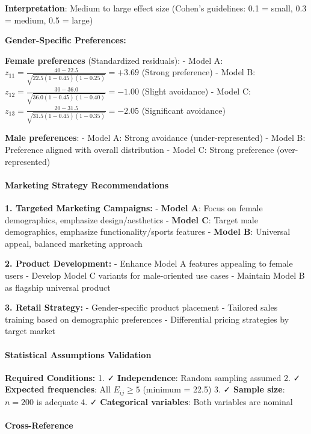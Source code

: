 \documentclass[11pt]{article}
\begin{document}
\textbf{Interpretation}: Medium to large effect size (Cohen's
guidelines: 0.1 = small, 0.3 = medium, 0.5 = large)

\textbf{Gender-Specific Preferences:}

\textbf{Female preferences} (Standardized residuals): - Model A:
\(z_{11} = \frac{40 - 22.5}{\sqrt{22.5(1-0.45)(1-0.25)}} = +3.69\)
(Strong preference) - Model B:
\(z_{12} = \frac{30 - 36.0}{\sqrt{36.0(1-0.45)(1-0.40)}} = -1.00\)
(Slight avoidance) - Model C:
\(z_{13} = \frac{20 - 31.5}{\sqrt{31.5(1-0.45)(1-0.35)}} = -2.05\)
(Significant avoidance)

\textbf{Male preferences}: - Model A: Strong avoidance
(under-represented) - Model B: Preference aligned with overall
distribution - Model C: Strong preference (over-represented)

\paragraph{Marketing Strategy
Recommendations}\label{marketing-strategy-recommendations}

\textbf{1. Targeted Marketing Campaigns:} - \textbf{Model A}: Focus on
female demographics, emphasize design/aesthetics - \textbf{Model C}:
Target male demographics, emphasize functionality/sports features -
\textbf{Model B}: Universal appeal, balanced marketing approach

\textbf{2. Product Development:} - Enhance Model A features appealing to
female users - Develop Model C variants for male-oriented use cases -
Maintain Model B as flagship universal product

\textbf{3. Retail Strategy:} - Gender-specific product placement -
Tailored sales training based on demographic preferences - Differential
pricing strategies by target market

\paragraph{Statistical Assumptions
Validation}\label{statistical-assumptions-validation}

\textbf{Required Conditions:} 1. ✓ \textbf{Independence}: Random
sampling assumed 2. ✓ \textbf{Expected frequencies}: All
\(E_{ij} \geq 5\) (minimum = 22.5) 3. ✓ \textbf{Sample size}:
\(n = 200\) is adequate 4. ✓ \textbf{Categorical variables}: Both
variables are nominal

\paragraph{Cross-Reference}\label{cross-reference}
\end{document}
